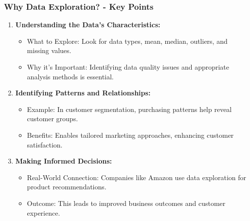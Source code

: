 \documentclass[aspectratio=169]{beamer}
\begin{document}
\begin{frame}[fragile]
    \frametitle{Why Data Exploration? - Key Points}
    \begin{enumerate}
        \item \textbf{Understanding the Data's Characteristics:}
        \begin{itemize}
            \item What to Explore: Look for data types, mean, median, outliers, and missing values.
            \item Why it's Important: Identifying data quality issues and appropriate analysis methods is essential.
        \end{itemize}

        \item \textbf{Identifying Patterns and Relationships:}
        \begin{itemize}
            \item Example: In customer segmentation, purchasing patterns help reveal customer groups.
            \item Benefits: Enables tailored marketing approaches, enhancing customer satisfaction.
        \end{itemize}

        \item \textbf{Making Informed Decisions:}
        \begin{itemize}
            \item Real-World Connection: Companies like Amazon use data exploration for product recommendations.
            \item Outcome: This leads to improved business outcomes and customer experience.
        \end{itemize}
    \end{enumerate}
\end{frame}
\end{document}

